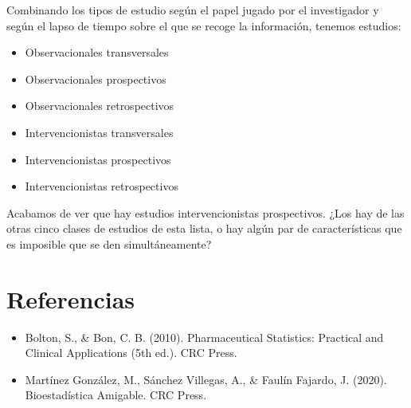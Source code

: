 \documentclass[
  letterpaper,
  DIV=11,
  numbers=noendperiod]{scrreprt}
\providecommand{\tightlist}{%
  \setlength{\itemsep}{0pt}\setlength{\parskip}{0pt}}\usepackage{longtable,booktabs,array}
\newlength{\cslhangindent}
\newenvironment{CSLReferences}[2] %
 {\begin{list}{}{%
  \setlength{\itemindent}{0pt}
  \setlength{\leftmargin}{0pt}
  \setlength{\parsep}{0pt}
  \ifodd #1
   \setlength{\leftmargin}{\cslhangindent}
   \setlength{\itemindent}{-1\cslhangindent}
  \fi
  \setlength{\itemsep}{#2\baselineskip}}}
 {\end{list}}
\begin{document}
Combinando los tipos de estudio según el papel jugado por el
investigador y según el lapso de tiempo sobre el que se recoge la
información, tenemos estudios:

\begin{itemize}
\tightlist
\item
  Observacionales transversales
\item
  Observacionales prospectivos
\item
  Observacionales retrospectivos
\item
  Intervencionistas transversales
\item
  Intervencionistas prospectivos
\item
  Intervencionistas retrospectivos
\end{itemize}

Acabamos de ver que hay estudios intervencionistas prospectivos. ¿Los
hay de las otras cinco clases de estudios de esta lista, o hay algún par
de características que es imposible que se den simultáneamente?


\chapter*{Referencias}\label{referencias}


\label{refs}
\begin{CSLReferences}{0}{1}
\end{CSLReferences}

\begin{itemize}
\item
  Bolton, S., \& Bon, C. B. (2010). Pharmaceutical Statistics: Practical
  and Clinical Applications (5th ed.). CRC Press.
\item
  Martínez González, M., Sánchez Villegas, A., \& Faulín Fajardo, J.
  (2020). Bioestadística Amigable. CRC Press.
\end{itemize}
\end{document}
